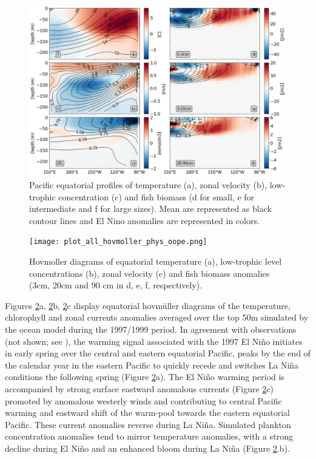 \begin{figure}[htp]
	\centering
	\includegraphics[scale=0.4]{figs/forage_mean_ond97.png}	
	\caption{Pacific equatorial profiles of temperature (a), zonal velocity (b), low-trophic concentration (c) and fish biomass (d for small, e for intermediate and f for large sizes). Mean are represented as black contour lines and El Nino anomalies are represented in colors.}	
	\label{fig:profiles}
\end{figure}

\begin{figure}[htp]
	\centering
	\texttt{[image: plot\_all\_hovmoller\_phys\_oope.png]}	
	\caption{Hovmoller diagrams of equatorial temperature (a), low-trophic level concentrations (b), zonal velocity (c) and fish biomass anomalies (3cm, 20cm and 90 cm in d, e, f, respectively).}	
	\label{fig:hov_nemo_ape}
\end{figure}

Figures \ref{fig:hov_nemo_ape}a, \ref{fig:hov_nemo_ape}b, \ref{fig:hov_nemo_ape}c display equatorial hovmüller diagrams of the temperature, chlorophyll and zonal currents anomalies averaged over the top 50m simulated by the ocean model during the 1997/1999 period. In agreement with observations (not shown; see \cite{lengaigneOceanResponseMarch2002}), the warming signal associated with the 1997 El Niño initiates in early spring over the central and eastern equatorial Pacific, peaks by the end of the calendar year in the eastern Pacific to quickly recede and switches La Niña conditions the following spring (Figure \ref{fig:hov_nemo_ape}a). The El Niño warming period is accompanied by strong surface eastward anomalous currents (Figure \ref{fig:hov_nemo_ape}c) promoted by anomalous westerly winds and contributing to central Pacific warming and eastward shift of the warm-pool towards the eastern equatorial Pacific. These current anomalies reverse during La Niña. Simulated plankton concentration anomalies tend to mirror temperature anomalies, with a strong decline during El Niño and an enhanced bloom during La Niña (Figure \ref{fig:hov_nemo_ape}.b). 

